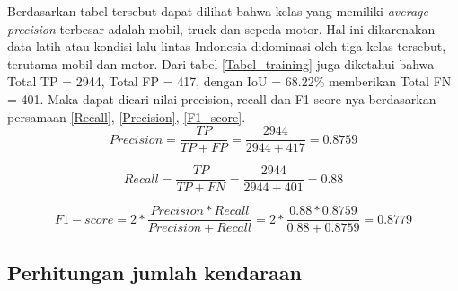 \documentclass[conference]{IEEEtran}
\begin{document}
Berdasarkan tabel tersebut dapat dilihat bahwa kelas yang memiliki \textit{average precision} terbesar adalah mobil, truck dan sepeda motor. Hal ini dikarenakan data latih atau kondisi lalu lintas Indonesia didominasi oleh tiga kelas tersebut, terutama mobil dan motor. 
Dari tabel \ref{Tabel_training} juga diketahui bahwa Total TP = 2944, Total FP = 417, dengan IoU = 68.22\% memberikan Total FN = 401. Maka dapat dicari nilai precision, recall dan F1-score nya berdasarkan persamaan \ref{Recall}, \ref{Precision}, \ref{F1_score}.
\begin{equation} \label{Precision}
	Precision = \frac{TP}{TP+FP} = \frac{2944}{2944+417} = 0.8759
\end{equation}

\begin{equation} \label{Recall}
	Recall = \frac{TP}{TP+FN} = \frac{2944}{2944+401} = 0.88
\end{equation}

\begin{equation} \label{F1_score}
	F1-score = 2*\frac{Precision * Recall}{Precision + Recall} = 2*\frac{0.88 * 0.8759}{0.88 + 0.8759} = 0.8779
\end{equation}

\subsection{Perhitungan jumlah kendaraan}
\end{document}
